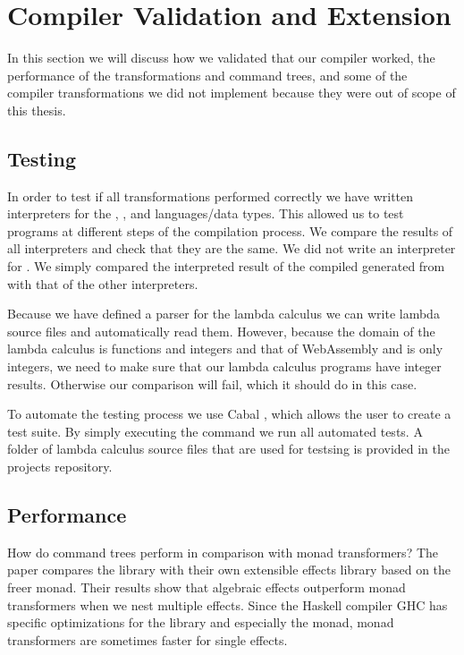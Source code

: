 \chapter{Compiler Validation and Extension}
In this section we will discuss how we validated that our compiler worked, the performance of the transformations and command trees, and some of the compiler transformations we did not implement because they were out of scope of this thesis.

\section{Testing}
In order to test if all transformations performed correctly we have written interpreters for the , , and  languages/data types. This allowed us to test programs at different steps of the compilation process. We compare the results of all interpreters and check that they are the same. We did not write an interpreter for . We simply compared the interpreted result of the compiled  generated from  with that of the other interpreters.

Because we have defined a parser for the lambda calculus we can write lambda source files and automatically read them. However, because the domain of the lambda calculus is functions and integers and that of WebAssembly and  is only integers, we need to make sure that our lambda calculus programs have integer results. Otherwise our comparison will fail, which it should do in this case.

To automate the testing process we use Cabal \autocite{haskellcabal}, which allows the user to create a test suite. By simply executing the  command we run all automated tests. A folder of lambda calculus source files that are used for testsing is provided in the projects repository.

\section{Performance}
How do command trees perform in comparison with monad transformers? The paper  \autocite{DBLP:conf/haskell/KiselyovI15} compares the  library with their own extensible effects library based on the freer monad. Their results show that algebraic effects outperform monad transformers when we nest multiple effects. Since the Haskell compiler GHC has specific optimizations for the  library and especially the  monad, monad transformers are sometimes faster for single effects.

